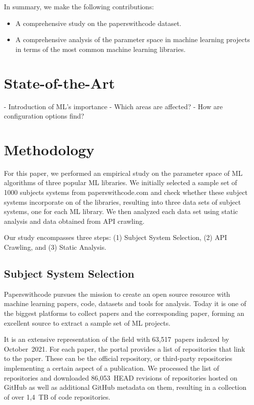 \documentclass[sigconf,review,anonymous]{acmart}
\begin{document}

In summary, we make the following contributions:
\begin{itemize}
    \item A comprehensive study on the paperswithcode dataset.
    \item A comprehensive analysis of the parameter space in machine learning projects in terms of the most common machine learning libraries.
\end{itemize}


\section{State-of-the-Art}\label{sec:background}
- Introduction of ML's importance
- Which areas are affected?
- How are configuration options find?


\section{Methodology}\label{sec:methodology}
For this paper, we performed an empirical study on the parameter space of ML algorithms of three popular ML libraries. 
We initially selected a sample set of 1000 subjects systems from paperswithcode.com and check whether these subject systems incorporate on of the libraries, resulting into three data sets of subject systems, one for each ML library.
We then analyzed each data set using static analysis and data obtained from API crawling.

Our study encompasses three steps: (1) Subject System Selection, (2) API Crawling, and (3) Static Analysis. 

\subsection{Subject System Selection}
Paperswithcode pursues the mission to create an open source resource with machine learning papers, code, datasets and tools for analysis. 
Today it is one of the biggest platforms to collect papers and the corresponding paper, forming an excellent source to extract a sample set of ML projects.

It is an extensive representation of the field with 63,517~papers indexed by October~2021. 
For each paper, the portal provides a list of repositories that link to the paper.
These can be the official repository, or third-party repositories implementing a certain aspect of a publication.
We processed the list of repositories and downloaded 86,053~HEAD revisions of repositories hosted on GitHub as well as additional GitHub metadata on them, resulting in a collection of over 1,4~TB of code repositories.
\end{document}
